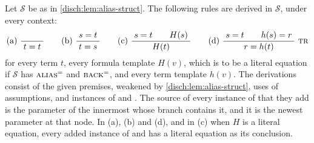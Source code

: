 \begin{proposition}
\label{disch:prop:alias-eq}
Let $\mathcal S$ be as in \cref{disch:lem:alias-struct}. The following
rules are derived in $\mathcal S$, under every context:
\[
 \text{(a)}\ \infrule{}{t=t}
 \qquad
 \text{(b)}\ \infrule{s=t}{t=s}
 \qquad
 \text{(c)}\ \infrule{s=t\qquad H(s)}{H(t)}
 \qquad
 \text{(d)}\ \infrule{s=t\qquad h(s)=r}{r=h(t)}\ \rulename{Tr}
\]
for every term $t$, every formula template $H(v)$, which is to be a literal
equation if $\mathcal S$ has $\rulename{Alias}^{=}$ and
$\rulename{Back}^{=}$, and every term template $h(v)$. The derivations
consist of the given premises, weakened by
\cref{disch:lem:alias-struct}, uses of assumptions, and instances of
 and . The source of every instance of
 that they add is the parameter of the innermost
 whose branch contains it, and it is the newest parameter
at that node. In (a), (b) and (d), and in (c) when $H$ is a literal
equation, every added instance of  and  has a
literal equation as its conclusion.
\end{proposition}

